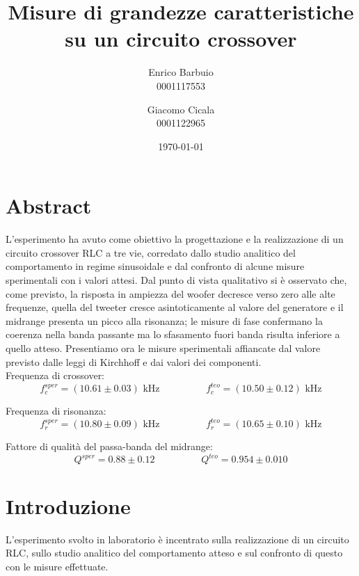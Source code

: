 \documentclass[12pt,italian]{article}
\title{Misure di grandezze caratteristiche su un circuito crossover}
\author{Enrico Barbuio \\ 0001117553 \and Giacomo Cicala \\ 0001122965}
\date{\today}
\begin{document}
\maketitle
\section*{Abstract}
L'esperimento ha avuto come obiettivo la progettazione e la realizzazione di un
circuito crossover RLC a tre vie, corredato dallo studio analitico del comportamento in
regime sinusoidale e dal confronto di alcune misure sperimentali con i valori
attesi. Dal punto di vista qualitativo si è osservato che, come previsto, la risposta in
ampiezza del woofer decresce verso zero alle alte frequenze, quella del tweeter
cresce asintoticamente al valore del generatore e il midrange presenta un picco
alla risonanza; le misure di fase confermano la coerenza nella banda passante
ma lo sfasamento fuori banda risulta inferiore a quello atteso. Presentiamo ora
le misure sperimentali affiancate dal valore previsto dalle leggi di Kirchhoff
e dai valori dei componenti.\\ Frequenza di crossover:
\begin{equation*}
	f_{c}^{sper} = (10.61 \pm 0.03) \text{ kHz} \hspace{2cm} f_{c}^{teo} = (10.50
	\pm 0.12) \text{ kHz}
\end{equation*}

\noindent
Frequenza di risonanza:
\begin{equation*}
	f_{r}^{sper} = (10.80 \pm 0.09) \text{ kHz} \hspace{2cm} f_{r}^{teo} = (10.65
	\pm 0.10) \text{ kHz}
\end{equation*}

\noindent
Fattore di qualità del passa-banda del midrange:
\begin{equation*}
	Q^{sper} = 0.88 \pm 0.12  \hspace{2cm}  Q^{teo} = 0.954 \pm 0.010
\end{equation*}

\section*{Introduzione}

L'esperimento svolto in laboratorio è incentrato sulla realizzazione di un
circuito RLC, sullo studio analitico del comportamento atteso e sul confronto
di questo con le misure effettuate.
\end{document}
